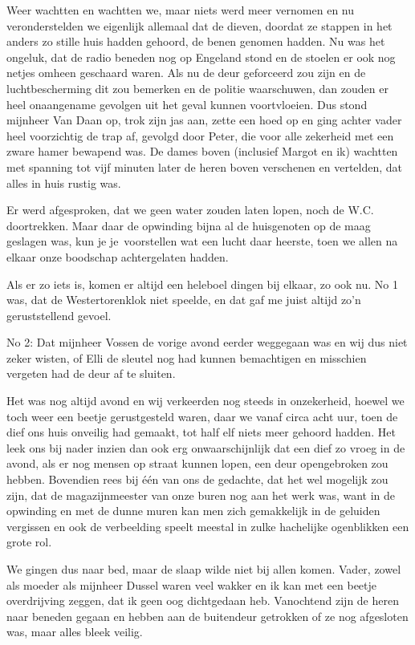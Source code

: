 \documentclass{book}
\begin{document}
Weer wachtten en wachtten we, maar niets werd meer vernomen en nu
veronderstelden we eigenlijk allemaal dat de dieven, doordat ze stappen
in het anders zo stille huis hadden gehoord, de benen genomen hadden. Nu
was het ongeluk, dat de radio beneden nog op Engeland stond en de
stoelen er ook nog netjes omheen geschaard waren. Als nu de deur
geforceerd zou zijn en de luchtbescherming dit zou bemerken en de
politie waarschuwen, dan zouden er heel onaangename gevolgen uit het
geval kunnen voortvloeien. Dus stond mijnheer Van Daan op, trok zijn jas
aan, zette een hoed op en ging achter vader heel voorzichtig de trap af,
gevolgd door Peter, die voor alle zekerheid met een zware hamer bewapend
was. De dames boven (inclusief Margot en ik) wachtten met spanning tot
vijf minuten later de heren boven verschenen en vertelden, dat alles in
huis rustig was.

Er werd afgesproken, dat we geen water zouden laten lopen, noch de W.C.
doortrekken. Maar daar de opwinding bijna al de huisgenoten op de maag
geslagen was, kun je je~voorstellen wat een lucht daar heerste, toen we
allen na elkaar onze boodschap achtergelaten hadden.

Als er zo iets is, komen er altijd een heleboel dingen bij elkaar, zo
ook nu. No 1 was, dat de Westertorenklok niet speelde, en dat gaf me
juist altijd zo'n geruststellend gevoel.

No 2: Dat mijnheer Vossen de vorige avond eerder weggegaan was en wij
dus niet zeker wisten, of Elli de sleutel nog had kunnen bemachtigen en
misschien vergeten had de deur af te sluiten.

Het was nog altijd avond en wij verkeerden nog steeds in onzekerheid,
hoewel we toch weer een beetje gerustgesteld waren, daar we vanaf circa
acht uur, toen de dief ons huis onveilig had gemaakt, tot half elf niets
meer gehoord hadden. Het leek ons bij nader inzien dan ook erg
onwaarschijnlijk dat een dief zo vroeg in de avond, als er nog mensen op
straat kunnen lopen, een deur opengebroken zou hebben. Bovendien rees
bij één van ons de gedachte, dat het wel mogelijk zou zijn, dat de
magazijnmeester van onze buren nog aan het werk was, want in de
opwinding en met de dunne muren kan men zich gemakkelijk in de geluiden
vergissen en ook de verbeelding speelt meestal in zulke hachelijke
ogenblikken een grote rol.

We gingen dus naar bed, maar de slaap wilde niet bij allen komen. Vader,
zowel als moeder als mijnheer Dussel waren veel wakker en ik kan met een
beetje overdrijving zeggen, dat ik geen oog dichtgedaan heb. Vanochtend
zijn de heren naar beneden gegaan en hebben aan de buitendeur getrokken
of ze nog afgesloten was, maar alles bleek veilig.
\end{document}
